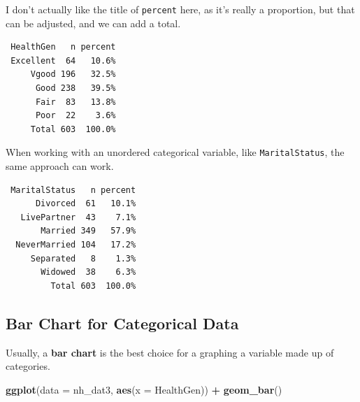 \documentclass[
]{book}
\newenvironment{Shaded}{\begin{snugshade}}{\end{snugshade}}
\newcommand{\DataTypeTok}[1]{\textcolor[rgb]{0.13,0.29,0.53}{#1}}
\newcommand{\KeywordTok}[1]{\textcolor[rgb]{0.13,0.29,0.53}{\textbf{#1}}}
\newcommand{\NormalTok}[1]{#1}
\newcommand{\OperatorTok}[1]{\textcolor[rgb]{0.81,0.36,0.00}{\textbf{#1}}}
\newcommand{\StringTok}[1]{\textcolor[rgb]{0.31,0.60,0.02}{#1}}
\begin{document}
I don't actually like the title of \texttt{percent} here, as it's really a proportion, but that can be adjusted, and we can add a total.

\begin{Shaded}
\end{Shaded}

\begin{verbatim}
 HealthGen   n percent
 Excellent  64   10.6%
     Vgood 196   32.5%
      Good 238   39.5%
      Fair  83   13.8%
      Poor  22    3.6%
     Total 603  100.0%
\end{verbatim}

When working with an unordered categorical variable, like \texttt{MaritalStatus}, the same approach can work.

\begin{Shaded}
\end{Shaded}

\begin{verbatim}
 MaritalStatus   n percent
      Divorced  61   10.1%
   LivePartner  43    7.1%
       Married 349   57.9%
  NeverMarried 104   17.2%
     Separated   8    1.3%
       Widowed  38    6.3%
         Total 603  100.0%
\end{verbatim}

\hypertarget{bar-chart-for-categorical-data}{%
\subsection{Bar Chart for Categorical Data}\label{bar-chart-for-categorical-data}}

Usually, a \textbf{bar chart} is the best choice for a graphing a variable made up of categories.

\begin{Shaded}
\begin{Highlighting}[]
\KeywordTok{ggplot}\NormalTok{(}\DataTypeTok{data =}\NormalTok{ nh_dat3, }\KeywordTok{aes}\NormalTok{(}\DataTypeTok{x =}\NormalTok{ HealthGen)) }\OperatorTok{+}\StringTok{ }
\StringTok{    }\KeywordTok{geom_bar}\NormalTok{()}
\end{Highlighting}
\end{Shaded}
\end{document}
